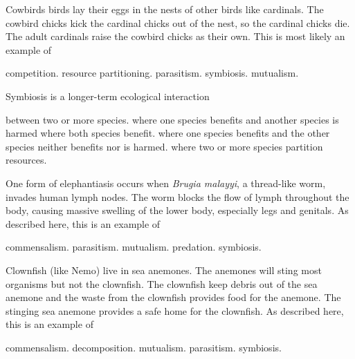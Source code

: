 \question
Cowbirds birds lay their eggs in the nests of other birds like cardinals. The cowbird chicks kick the cardinal chicks out of the nest, so the cardinal chicks die. The adult cardinals raise the cowbird chicks as their own. This is most likely an example of 

\begin{choices}
	\choice competition. %
	\choice resource partitioning. %
	\correctchoice parasitism. %
	\choice symbiosis. %
	\choice mutualism. %
\end{choices}


\question
Symbiosis is a longer-term ecological interaction

\begin{choices}
	\correctchoice between two or more species. %
	\choice where one species benefits and another species is harmed %
	\choice where both species benefit. %
	\choice  where one species benefits and the other species neither benefits nor is harmed. %
	\choice where two or more species partition resources. %
\end{choices}

\question
One form of elephantiasis occurs when \textit{Brugia malayyi}, a thread-like worm, invades human lymph nodes. The worm blocks the flow of lymph throughout the body, causing massive swelling of the lower body, especially legs and genitals. As described here, this is an example of

\begin{choices}
	\choice commensalism.%
	\correctchoice parasitism.%
	\choice mutualism.%
	\choice predation.%
	\choice symbiosis.%
\end{choices}

\question
Clownfish (like Nemo) live in sea anemones. The anemones will sting most organisms but not the clownfish. The clownfish keep debris out of the sea anemone and the waste from the clownfish provides food for the anemone. The stinging sea anemone provides a safe home for the clownfish. As described here, this is an example of

\begin{choices}
	\choice commensalism.%
	\choice decomposition.%
	\correctchoice mutualism.%
	\choice parasitism.%
	\choice symbiosis.%
\end{choices}

